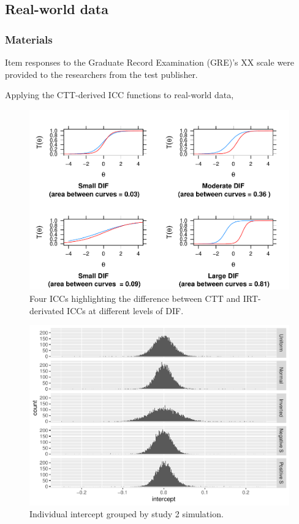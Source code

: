 \documentclass[
  man]{apa6}
\begin{document}
\hypertarget{real-world-data}{%
\subsection{Real-world data}\label{real-world-data}}

\hypertarget{materials}{%
\subsubsection{Materials}\label{materials}}

Item responses to the Graduate Record Examination (GRE)'s XX scale were provided to the researchers from the test publisher.

Applying the CTT-derived ICC functions to real-world data,

\begin{figure}
\centering
\includegraphics{ICC_project_files/figure-latex/plotting-1.pdf}
\caption{\label{fig:plotting}Four ICCs highlighting the difference between CTT and IRT-derivated ICCs at different levels of DIF.}
\end{figure}

\begin{figure}
\centering
\includegraphics{ICC_project_files/figure-latex/stackedplotIntercept-1.pdf}
\caption{\label{fig:stackedplotIntercept}Individual intercept grouped by study 2 simulation.}
\end{figure}
\end{document}
